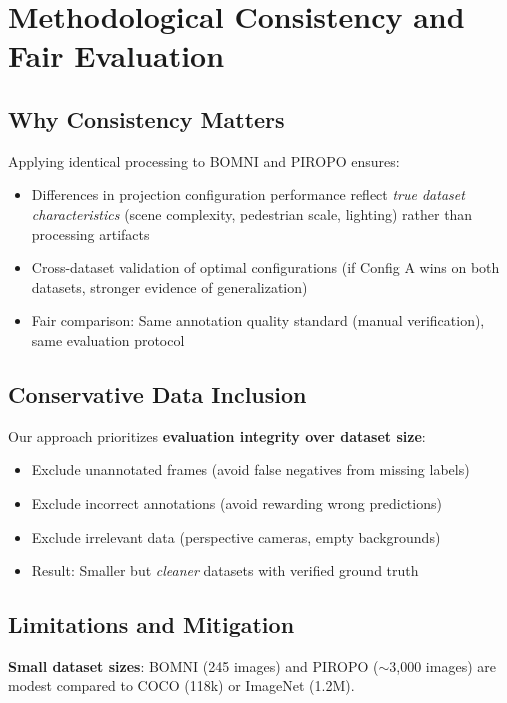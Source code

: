 \documentclass[11pt]{article}
\begin{document}
\section{Methodological Consistency and Fair Evaluation}

\subsection{Why Consistency Matters}

Applying identical processing to BOMNI and PIROPO ensures:
\begin{itemize}[leftmargin=*]
    \item Differences in projection configuration performance reflect \textit{true dataset characteristics} (scene complexity, pedestrian scale, lighting) rather than processing artifacts
    \item Cross-dataset validation of optimal configurations (if Config A wins on both datasets, stronger evidence of generalization)
    \item Fair comparison: Same annotation quality standard (manual verification), same evaluation protocol
\end{itemize}

\subsection{Conservative Data Inclusion}

Our approach prioritizes \textbf{evaluation integrity over dataset size}:
\begin{itemize}[leftmargin=*]
    \item Exclude unannotated frames (avoid false negatives from missing labels)
    \item Exclude incorrect annotations (avoid rewarding wrong predictions)
    \item Exclude irrelevant data (perspective cameras, empty backgrounds)
    \item Result: Smaller but \textit{cleaner} datasets with verified ground truth
\end{itemize}

\subsection{Limitations and Mitigation}

\textbf{Small dataset sizes}: BOMNI (245 images) and PIROPO ($\sim$3,000 images) are modest compared to COCO (118k) or ImageNet (1.2M).
\end{document}
